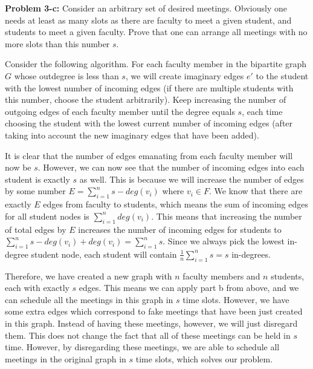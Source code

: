 \documentclass[psamsfonts]{amsart}
\newenvironment{sol}{\vspace{0.25cm}{\large \bfseries Solution:}}{\qedsymbol}
\newenvironment{prob}[1]{\begin{framed}{\large \bfseries Problem #1:}}{\end{framed}}
\begin{document}
\begin{prob}{3-c}
Consider an arbitrary set of desired meetings. Obviously one needs at least as many slots as there are faculty to meet a given student, and students to meet a given faculty. Prove that one can arrange all meetings with no more slots than this number $s$.
\end{prob}
\begin{sol}
Consider the following algorithm. For each faculty member in the bipartite graph $G$ whose outdegree is less than $s$, we will create imaginary edges $e'$ to the student with the lowest number of incoming edges (if there are multiple students with this number, choose the student arbitrarily). Keep increasing the number of outgoing edges of each faculty member until the degree equals $s$, each time choosing the student with the lowest current number of incoming edges (after taking into account the new imaginary edges that have been added).

It is clear that the number of edges emanating from each faculty member will now be $s$. However, we can now see that the number of incoming edges into each student is exactly $s$ as well. This is because we will increase the number of edges by some number $E = \sum_{i=1}^n s - deg(v_i)$ where $v_i \in F$. We know that there are exactly $E$ edges from faculty to students, which means the sum of incoming edges for all student nodes is $\sum_{i=1}^n deg(v_i)$. This means that increasing the number of total edges by $E$ increases the number of incoming edges for students to $\sum_{i=1}^n s - deg(v_i) + deg(v_i) = \sum_{i=1}^n s$. Since we always pick the lowest in-degree student node, each student will contain $\frac{1}{n} \sum_{i=1}^n s = s$ in-degrees. 

Therefore, we have created a new graph with $n$ faculty members and $n$ students, each with exactly $s$ edges. This means we can apply part b from above, and we can schedule all the meetings in this graph in $s$ time slots. However, we have some extra edges which correspond to fake meetings that have been just created in this graph. Instead of having these meetings, however, we will just disregard them. This does not change the fact that all of these meetings can be held in $s$ time. However, by disregarding these meetings, we are able to schedule all meetings in the original graph in $s$ time slots, which solves our problem.
\end{sol}
\end{document}
